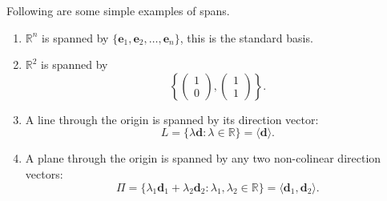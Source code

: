 \begin{example}
    Following are some simple examples of spans.
    \begin{enumerate}
        \item $\mathbb R^n$ is spanned by $\{\bm e_1,\bm e_2,\ldots,\bm e_n\}$, this is the standard basis.
        
        \item $\mathbb R^2$ is spanned by
        \[
            \left\{
            \begin{pmatrix}
                1\\0
            \end{pmatrix}
            ,
            \begin{pmatrix}
                1\\1
            \end{pmatrix}
            \right\}
            .
        \]
        
        \item A line through the origin is spanned by its direction vector: \[L=\{\lambda\bm d:\lambda\in\mathbb R\}=\langle\bm d\rangle.\]
        
        \item A plane through the origin is spanned by any two non-colinear direction vectors: \[\Pi=\{\lambda_1\bm d_1+\lambda_2\bm d_2:\lambda_1,\lambda_2\in\mathbb R\}=\langle\bm d_1,\bm d_2\rangle.\]
    \end{enumerate}
\end{example}

